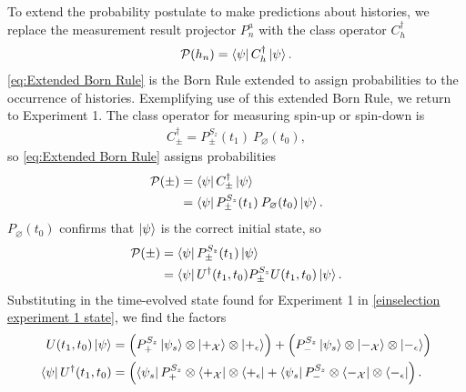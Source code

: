 To extend the probability postulate to make predictions about histories, we replace the measurement result projector $P^a_n$ with the class operator $C_h^\dagger$
\begin{align} \label{eq:Extended Born Rule}
  \mathcal{P}(h_n) = \bra{\psi} C_h^\dagger \ket{\psi}.
\end{align}
\autoref{eq:Extended Born Rule} is the Born Rule extended to assign probabilities to the occurrence of histories. Exemplifying use of this extended Born Rule, we return to Experiment 1. The class operator for measuring spin-up or spin-down is
\begin{align}
  C_\pm^\dagger = P^{S_z}_\pm (t_1) \: P_\varnothing (t_0),
\end{align}
so \autoref{eq:Extended Born Rule} assigns probabilities
\begin{align}
  \mathcal{P}(\pm) &= \bra{\psi} C_\pm^\dagger \ket{\psi} \\ \nonumber
  &= \bra{\psi} P^{S_z}_\pm (t_1) \: P_\varnothing (t_0) \ket{\psi}.
\end{align}
$P_\varnothing (t_0)$ confirms that $\ket{\psi}$ is the correct initial state, so
\begin{align}
  \mathcal{P}(\pm) &= \bra{\psi} P^{S_z}_\pm (t_1) \ket{\psi} \\ \nonumber
  &= \bra{\psi} U^\dagger(t_1, t_0) P^{S_z}_\pm U(t_1, t_0) \ket{\psi}.
\end{align}
Substituting in the time-evolved state found for Experiment 1 in \autoref{einselection experiment 1 state}, we find the factors
\begin{align}
  U(t_1, t_0) \ket{\psi} &= \left(P^{S_z}_+ \ket{\psi_s} \otimes \ket{+_\mathcal{X}} \otimes \ket{+_\epsilon}\right) + \left(P^{S_z}_- \ket{\psi_s} \otimes \ket{-_\mathcal{X}} \otimes \ket{-_\epsilon} \right)\\ \nonumber
  \bra{\psi} U^\dagger(t_1, t_0) &= \left(\bra{\psi_s}P^{S_z}_+ \otimes \bra{+_\mathcal{X}} \otimes \bra{+_\epsilon} + \bra{\psi_s}P^{S_z}_- \otimes \bra{-_\mathcal{X}} \otimes \bra{-_\epsilon}\right).
\end{align}
